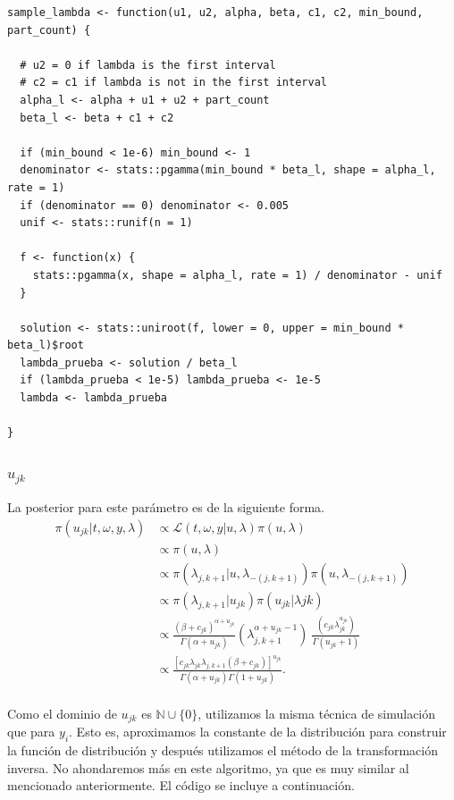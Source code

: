 \documentclass[11pt,a4paper]{article}
\begin{document}
\begin{lstlisting}
sample_lambda <- function(u1, u2, alpha, beta, c1, c2, min_bound, part_count) {

  # u2 = 0 if lambda is the first interval
  # c2 = c1 if lambda is not in the first interval
  alpha_l <- alpha + u1 + u2 + part_count
  beta_l <- beta + c1 + c2

  if (min_bound < 1e-6) min_bound <- 1
  denominator <- stats::pgamma(min_bound * beta_l, shape = alpha_l, rate = 1)
  if (denominator == 0) denominator <- 0.005
  unif <- stats::runif(n = 1)

  f <- function(x) {
    stats::pgamma(x, shape = alpha_l, rate = 1) / denominator - unif
  }

  solution <- stats::uniroot(f, lower = 0, upper = min_bound * beta_l)$root
  lambda_prueba <- solution / beta_l
  if (lambda_prueba < 1e-5) lambda_prueba <- 1e-5
  lambda <- lambda_prueba

}
\end{lstlisting}



\subsubsection{$u_{jk}$}

La posterior para este parámetro es de la siguiente forma.\\

\begin{align*}
\pi(u_{jk} | t, \omega, y ,\lambda) &\propto \mathcal{L}(t, \omega, y | u, \lambda) \pi(u, \lambda)\\
&\propto \pi(u, \lambda)\\
&\propto \pi(\lambda_{j, k+1} | u, \lambda_{-(j, k+1)}) \pi(u, \lambda_{-(j, k+1)})\\
&\propto \pi(\lambda_{j, k+1} | u_{jk}) \pi(u_{jk}|\lambda{jk})\\
&\propto \frac{(\beta + c_{jk})^{\alpha + u_{jk}}}{\Gamma(\alpha + u_{jk})} \left(\lambda_{j, k+1}^{\alpha + u_{jk}-1}\right) \ \frac{\left(c_{jk}\lambda_{jk}^{u_{jk}}\right)}{\Gamma(u_{jk}+1)}\\
&\propto \frac{\left[c_{jk}\lambda_{jk}\lambda_{j, k+1}(\beta + c_{jk})\right]^{u_{jk}}}{\Gamma(\alpha + u_{jk})\Gamma(1 + u_{jk})}.\\
\end{align*}

Como el dominio de $u_{jk}$ es $\mathbb{N}\cup \lbrace 0 \rbrace$, utilizamos la misma técnica de simulación que para $y_i$. Esto es, aproximamos la constante de la distribución para construir la función de distribución y después utilizamos el método de la transformación inversa. No ahondaremos más en este algoritmo, ya que es muy similar al mencionado anteriormente. El código se incluye a continuación.\\
\end{document}
